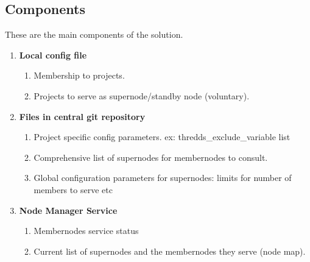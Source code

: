 \documentclass[oneside,12pt]{memoir}
\begin{document}
\subsection{Components}
These are the main components of the solution.
\begin{enumerate}
\item
\textbf{Local config file} 
\begin{enumerate}
\item Membership to projects.
\item Projects to serve as supernode/standby node (voluntary).



\end{enumerate}





\item \textbf{Files in central git repository}
\begin{enumerate}
\item Project specific config parameters. ex: thredds\_exclude\_variable list
\item Comprehensive list of supernodes for membernodes to consult.
\item Global configuration parameters for supernodes: limits for number of members to serve etc
\end{enumerate}
\item \textbf{Node Manager Service}
\begin{enumerate}
\item Membernodes service status
\item Current list of supernodes and the membernodes they serve (node map).
\end{enumerate}


\end{enumerate}
\end{document}
